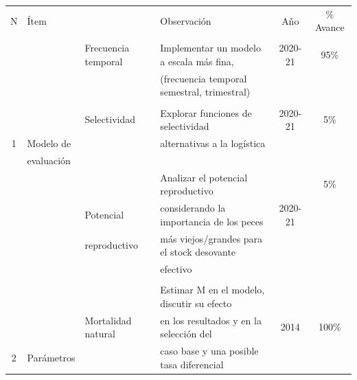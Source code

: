 \documentclass[
  spanish,
]{article}
\begin{document}
\begin{table}[h]
  \centering
  \resizebox{16cm}{!} {
  \begin{tabular}{|c|l|l|l|c|c|}
  \hline
  N  &  Ítem           &                      &   Observación                                   &   Año          &  \% Avance \\ 
     &               &                      &                                                 &              & \\ \hline
       &                 & Frecuencia temporal  & Implementar un modelo a escala más fina,        & 2020-21      & 95\% \\
     &                 &                      & (frecuencia temporal semestral, trimestral)     &              & \\
     &               &                      &                                                 &              & \\
     &               & Selectividad         & Explorar funciones de selectividad                &  2020-21     & 5\% \\
  1  &  Modelo de    &                      & alternativas a la logística                     &              & \\ 
     & evaluación    &                      &                                                 &              & \\
     &               &                        & Analizar el potencial reproductivo              &                & 5\% \\
     &               & Potencial            & considerando la importancia de los peces        &  2020-21     & \\
     &               & reproductivo         & más viejos/grandes para el stock desovante      &              & \\
     &               &                      & efectivo                                        &              & \\ \hline
     &               &                      &                                                 &              & \\
     &               &                      & Estimar M en el modelo, discutir su efecto      &              & \\
     &               & Mortalidad natural   & en los resultados y en la selección del         &  2014        & 100\%\\
 2   & Parámetros    &                      & caso base y  una posible tasa diferencial       &              & \\

\end{tabular}}
\end{table}
\end{document}
